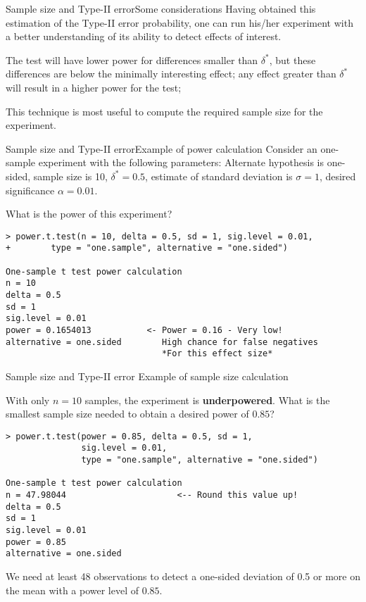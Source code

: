 
\begin{frame}{Sample size and Type-II error}{Some considerations}
  Having obtained this estimation of the Type-II error probability, one can run his/her experiment with a better understanding of its ability to detect effects of interest.\bigskip

  The test will have lower power for differences smaller than $\delta^*$, but these differences are below the minimally interesting effect; any effect greater than $\delta^*$ will result in a higher power for the test;\bigskip

  This technique is most useful to compute the required sample size for the   experiment.
\end{frame}

\begin{frame}[fragile]{Sample size and Type-II error}{Example of power calculation}
Consider an one-sample experiment with the following parameters: Alternate hypothesis is one-sided, sample size is 10, $\delta^*=0.5$, estimate of standard deviation is $\sigma=1$, desired significance $\alpha=0.01$.\medskip

What is the power of this experiment?

{\smaller
\begin{verbatim}
> power.t.test(n = 10, delta = 0.5, sd = 1, sig.level = 0.01,
+        type = "one.sample", alternative = "one.sided")

One-sample t test power calculation
n = 10
delta = 0.5
sd = 1
sig.level = 0.01
power = 0.1654013           <- Power = 0.16 - Very low!
alternative = one.sided        High chance for false negatives
                               *For this effect size*
\end{verbatim}}
\end{frame}

\begin{frame}[fragile]{Sample size and Type-II error}
{Example of sample size calculation}

With only $n=10$ samples, the experiment is {\bf underpowered}. What is the smallest sample size needed to obtain a desired power of $0.85$?

{\smaller
\begin{verbatim}
> power.t.test(power = 0.85, delta = 0.5, sd = 1,
               sig.level = 0.01,
               type = "one.sample", alternative = "one.sided")

One-sample t test power calculation
n = 47.98044                      <-- Round this value up!
delta = 0.5
sd = 1
sig.level = 0.01
power = 0.85
alternative = one.sided
\end{verbatim}}

We need at least 48 observations to detect a one-sided deviation of 0.5 or more on the mean  with a power level of $0.85$.
\end{frame}

